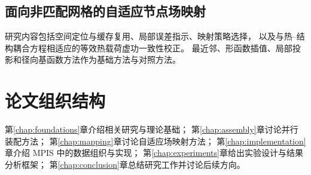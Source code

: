 \subsection{面向非匹配网格的自适应节点场映射}
研究内容包括空间定位与缓存复用、局部误差指示、映射策略选择，
以及与热--结构耦合方程相适应的等效热载荷虚功一致性校正。
最近邻、形函数插值、局部投影和径向基函数方法作为基础方法与对照方法。

\section{论文组织结构}
第\ref{chap:foundations}章介绍相关研究与理论基础；
第\ref{chap:assembly}章讨论并行装配方法；
第\ref{chap:mapping}章讨论自适应场映射方法；
第\ref{chap:implementation}章介绍 MPIS 中的数据组织与实现；
第\ref{chap:experiments}章给出实验设计与结果分析框架；
第\ref{chap:conclusion}章总结研究工作并讨论后续方向。
